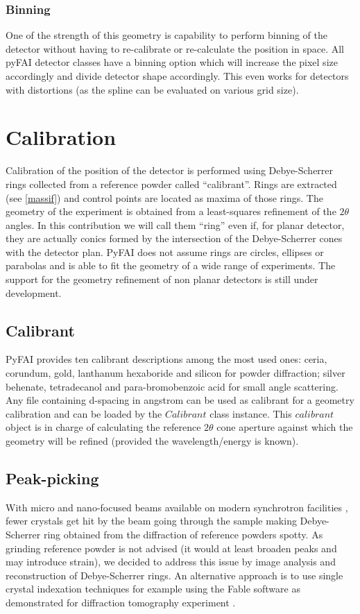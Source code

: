 \documentclass[preprint]{iucr}
\begin{document}
\subsubsection{Binning}
One of the strength of this geometry is capability to perform binning of the
detector without having to re-calibrate or re-calculate the position in space.
All pyFAI detector classes have a binning option which will increase the pixel
size accordingly and divide detector shape accordingly. 
This even works for detectors with distortions (as the spline can be
evaluated on various grid size).

\section{Calibration}
Calibration of the position of the detector is performed using Debye-Scherrer
rings collected from a reference powder called ``calibrant''.
Rings are extracted (see \ref{massif}) and control points are located as maxima
of those rings.
The geometry of the experiment is obtained from a least-squares refinement of
the $2\theta$ angles.
In this contribution we will call them ``ring'' even if, for planar detector,
they are actually conics formed by the intersection of the Debye-Scherrer cones
with the detector plan. 
PyFAI does not assume rings are circles, ellipses or parabolas and is able to
fit the geometry of a wide range of experiments.
The support for the geometry refinement of non planar detectors is still under
development.

\subsection{Calibrant}
PyFAI provides ten calibrant descriptions among the most used ones: ceria,
corundum, gold, lanthanum hexaboride and silicon for powder diffraction;
silver behenate, tetradecanol and para-bromobenzoic acid for small angle scattering.
Any file containing d-spacing in angstrom can be used as calibrant for a
geometry calibration and can be loaded by the $Calibrant$ class instance.
This $calibrant$ object is in charge of
calculating the reference $2\theta$ cone aperture 
against which the geometry will be refined (provided the wavelength/energy is
known).

\subsection{Peak-picking}
With micro and nano-focused beams available on modern synchrotron facilities
\cite{id13}, fewer crystals get hit by the beam going through the
sample making Debye-Scherrer ring obtained from the diffraction of reference
powders spotty.
As grinding reference powder is not advised (it would at least broaden peaks
and may introduce strain), we decided to
address this issue by image analysis and reconstruction of Debye-Scherrer rings.
An alternative approach is to use single crystal indexation techniques for
example using the Fable software \cite{fable} as demonstrated for diffraction
tomography experiment \cite{bonnin}.
\end{document}
